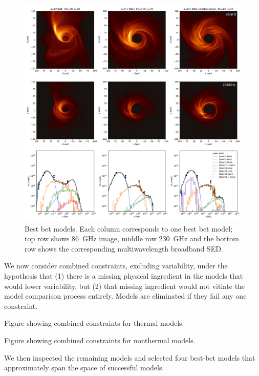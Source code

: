 \begin{figure}
  \centering
  \includegraphics[width=\textwidth]{figures/bestbet.pdf}
  \caption{Best bet models.  Each column corresponds to one best bet model; top row shows 86~GHz image, middle row 230~GHz and the bottom row shows the corresponding multiwavelength broadband SED.} \label{fig:bestbet}
\end{figure}

We now consider combined constraints, excluding variability, under the hypothesis that (1) there is a missing physical ingredient in the models that would lower variability, but (2) that missing ingredient would not vitiate the model comparison process entirely.  Models are eliminated if they fail any one constraint.

Figure showing combined constraints for thermal models.

Figure showing combined constraints for nonthermal models.

We then inspected the remaining models and selected four best-bet models that approximately span the space of successful models.  

